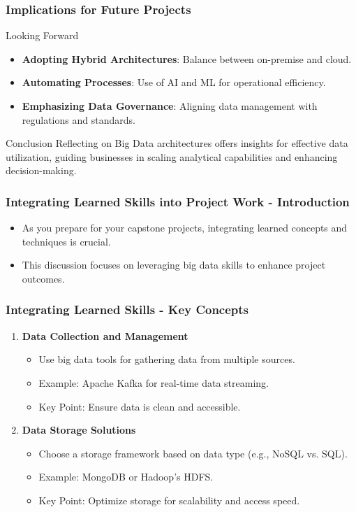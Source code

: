 \documentclass[aspectratio=169]{beamer}
\begin{document}
\begin{frame}[fragile]
    \frametitle{Implications for Future Projects}
    \begin{block}{Looking Forward}
        \begin{itemize}
            \item \textbf{Adopting Hybrid Architectures}: Balance between on-premise and cloud.
            \item \textbf{Automating Processes}: Use of AI and ML for operational efficiency.
            \item \textbf{Emphasizing Data Governance}: Aligning data management with regulations and standards.
        \end{itemize}
    \end{block}
    
    \begin{block}{Conclusion}
        Reflecting on Big Data architectures offers insights for effective data utilization, guiding businesses in scaling analytical capabilities and enhancing decision-making.
    \end{block}
\end{frame}

\begin{frame}[fragile]
    \frametitle{Integrating Learned Skills into Project Work - Introduction}
    \begin{itemize}
        \item As you prepare for your capstone projects, integrating learned concepts and techniques is crucial.
        \item This discussion focuses on leveraging big data skills to enhance project outcomes.
    \end{itemize}
\end{frame}

\begin{frame}[fragile]
    \frametitle{Integrating Learned Skills - Key Concepts}
    \begin{enumerate}
        \item \textbf{Data Collection and Management}
            \begin{itemize}
                \item Use big data tools for gathering data from multiple sources.
                \item Example: Apache Kafka for real-time data streaming.
                \item Key Point: Ensure data is clean and accessible.
            \end{itemize}
        \item \textbf{Data Storage Solutions}
            \begin{itemize}
                \item Choose a storage framework based on data type (e.g., NoSQL vs. SQL).
                \item Example: MongoDB or Hadoop's HDFS.
                \item Key Point: Optimize storage for scalability and access speed.
            \end{itemize}
    \end{enumerate}
\end{frame}
\end{document}
